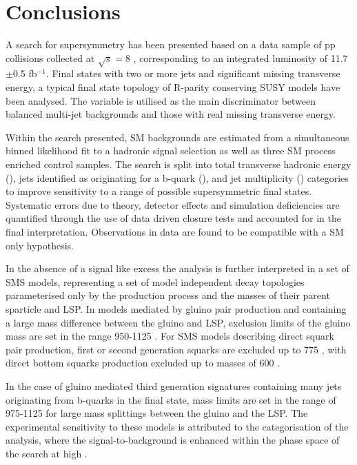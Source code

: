 \chapter{Conclusions}
\label{chap:conclusions}

A search for supersymmetry has been presented based on a data sample of pp collisions collected at $\sqrt{s} = 8$ \TeV, corresponding to an integrated luminosity of 11.7$\pm$0.5 fb$^{-1}$. Final states with two or more jets and significant missing transverse energy, a typical final state topology of R-parity conserving \ac{SUSY} models have been analysed. The \alphat variable is utilised as the main discriminator between balanced multi-jet backgrounds and those with real missing transverse energy. 

Within the search presented, \acf{SM} backgrounds are estimated from a simultaneous binned likelihood fit to a hadronic signal selection as well as three \ac{SM} process enriched control samples. The search is split into total transverse hadronic energy (\theht), jets identified as originating for a b-quark (\nbreco), and jet multiplicity (\njet) categories to improve sensitivity to a range of possible supersymmetric final states. Systematic errors due to theory, detector effects and simulation deficiencies are quantified through the use of data driven closure tests and accounted for in the final interpretation. Observations in data are found to be compatible with a \ac{SM} only hypothesis. 

In the absence of a signal like excess the analysis is further interpreted in a set of \acf{SMS} models, representing a set of model independent decay topologies parameterised only by the production process and the masses of their parent sparticle and \acf{LSP}. In models mediated by gluino pair production and containing a large mass difference between the gluino and \ac{LSP}, exclusion limits of the gluino mass are set in the range 950-1125 \GeV. For \ac{SMS} models describing direct squark pair production, first or second generation squarks are excluded up to 775 \GeV, with direct bottom squarks production excluded up to masses of 600 \GeV. 

In the case of gluino mediated third generation signatures containing many jets originating from b-quarks in the final state, mass limits are set in the range of 975-1125 \GeV for large mass splittings between the gluino and the \ac{LSP}. The experimental sensitivity to these models is attributed to the \nbreco categorisation of the analysis, where the signal-to-background is enhanced within the phase space of the search at high \nbreco.

